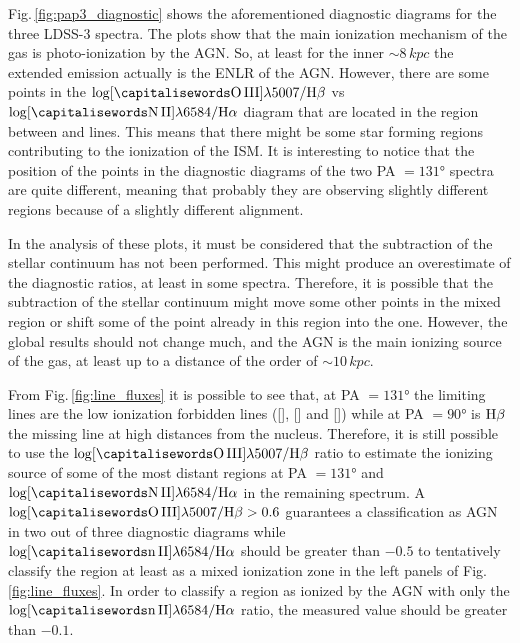 \documentclass[../main.tex]{subfiles}
\begin{document}
Fig.\,\ref{fig:pap3_diagnostic} shows the aforementioned diagnostic diagrams for the three LDSS-3 spectra.
The plots show that the main ionization mechanism of the gas is photo-ionization by the AGN.
So, at least for the inner $\sim 8\,\si{kpc}$ the extended emission actually is the ENLR of the AGN.
However, there are some points in the $\log [\rm \ion{O}{III}]\lambda5007/\Hb$ vs $\log [\rm \ion{N}{II}]\lambda6584/\Ha$ diagram that are located in the region between \citet{Kewley01} and \citet{Kauffmann03} lines.
This means that there might be some star forming regions contributing to the ionization of the ISM.
It is interesting to notice that the position of the points in the diagnostic diagrams of the two PA $=\ang{131}$ spectra are quite different, meaning that probably they are observing slightly different regions because of a slightly different alignment. 

In the analysis of these plots, it must be considered that the subtraction of the stellar continuum has not been performed.
This might produce an overestimate of the diagnostic ratios, at least in some spectra.
Therefore, it is possible that the subtraction of the stellar continuum might move some other points in the mixed region or shift some of the point already in this region into the  one.
However, the global results should not change much, and the AGN is the main ionizing source of the gas, at least up to a distance of the order of $\sim 10\,\si{kpc}$.

From Fig.\,\ref{fig:line_fluxes} it is possible to see that, at PA $=\ang{131}$ the limiting lines are the low ionization forbidden lines ([], [] and []) while at PA $=\ang{90}$ is $\rm H\beta$ the missing line at high distances from the nucleus.
Therefore, it is still possible to use the $\log[\rm \ion{O}{III}]\lambda5007/\Hb$ ratio to estimate the ionizing source of some of the most distant regions at PA $=\ang{131}$ and  $\log[\rm \ion{N}{II}]\lambda6584/\Ha$ in the remaining spectrum.
A $\log[\rm \ion{O}{III}]\lambda5007/\Hb>0.6$
guarantees a classification as AGN in two out of three diagnostic diagrams while $\log[\rm \ion{n}{II}]\lambda6584/\Ha$ should be greater than $-0.5$ to tentatively classify the region at least as a mixed ionization zone in the left panels of Fig.\,\ref{fig:line_fluxes}.
In order to classify a region as ionized by the AGN with only the $\log[\rm \ion{n}{II}]\lambda6584/\Ha$ ratio, the measured value should be greater than $-0.1$.
\end{document}
